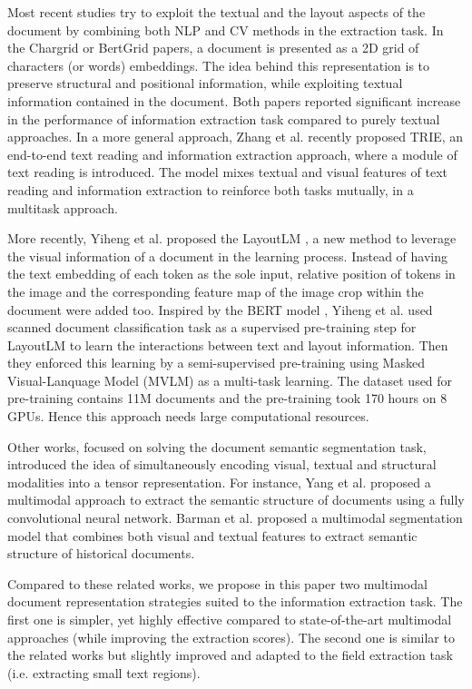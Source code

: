 \documentclass[runningheads]{llncs}
\begin{document}
Most recent studies try to exploit the textual and the layout aspects of the document by combining both NLP and CV methods in the extraction task. In the Chargrid \cite{chargrid} or BertGrid \cite{bertgrid} papers, a document is presented as a 2D grid of characters (or words) embeddings. The idea behind this representation is to preserve structural and positional information, while exploiting textual information contained in the document. Both papers reported significant increase in the performance of information extraction task compared to purely textual approaches. In a more general approach, Zhang et al. \cite{trie} recently proposed TRIE, an end-to-end text reading and information extraction approach, where a module of text reading is introduced. The model mixes textual and visual features of text reading and information extraction to reinforce both tasks mutually, in a multitask approach. 

More recently, Yiheng et al. proposed the LayoutLM \cite{layoutLM}, a new method to leverage the visual information of a document in the learning process. 
Instead of having  the text embedding of each token as the sole input, relative position of tokens in the image and the corresponding feature map of the image crop within the document were added too. Inspired by the BERT model \cite{bert}, Yiheng et al. used  scanned document classification task as a supervised pre-training step for LayoutLM to learn the interactions between text and layout information. Then they enforced this learning by a semi-supervised pre-training using Masked Visual-Lanquage Model (MVLM) as a multi-task learning. The dataset used for pre-training contains 11M documents and the pre-training took 170 hours on 8 GPUs. Hence this approach needs large computational resources.

Other works, focused on solving the document semantic segmentation task, introduced the idea of simultaneously encoding visual, textual and structural modalities into a tensor representation. For instance, Yang et al. \cite{yang2017learning} proposed a multimodal approach to extract the semantic structure of documents using a fully convolutional neural network. Barman et al. \cite{Barman}  proposed a multimodal segmentation model that combines both visual and textual features to extract semantic structure of historical documents.

Compared to these related works, we propose in this paper two multimodal document representation strategies suited to the information extraction task. The first one  is simpler, yet highly effective compared to state-of-the-art multimodal approaches (while improving the extraction scores). The second one is similar to the related works \cite{yang2017learning,Barman} but slightly improved and adapted to the field extraction task (i.e. extracting small text regions).
\end{document}
